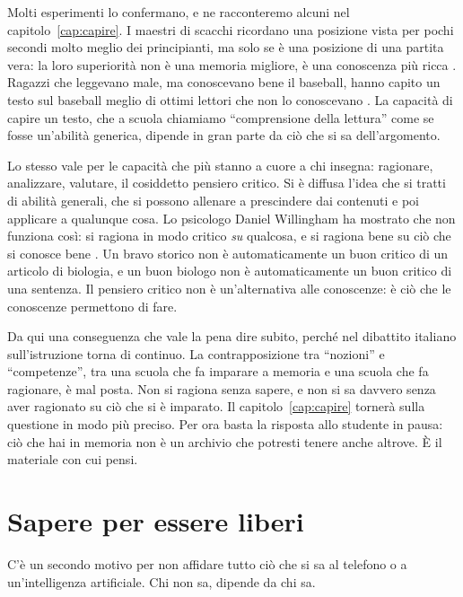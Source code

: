 Molti esperimenti lo confermano, e ne racconteremo alcuni nel
capitolo~\ref{cap:capire}. I maestri di scacchi ricordano una posizione
vista per pochi secondi molto meglio dei principianti, ma solo se è una
posizione di una partita vera: la loro superiorità non è una memoria
migliore, è una conoscenza più ricca \parencite{chase1973}. Ragazzi che
leggevano male, ma conoscevano bene il baseball, hanno capito un testo
sul baseball meglio di ottimi lettori che non lo conoscevano
\parencite{recht1988}. La capacità di capire un testo, che a scuola
chiamiamo \enquote{comprensione della lettura} come se fosse un'abilità
generica, dipende in gran parte da ciò che si sa dell'argomento.

Lo stesso vale per le capacità che più stanno a cuore a chi insegna:
ragionare, analizzare, valutare, il cosiddetto pensiero critico. Si è
diffusa l'idea che si tratti di abilità generali, che si possono
allenare a prescindere dai contenuti e poi applicare a qualunque cosa. Lo
psicologo Daniel Willingham ha mostrato che non funziona così: si
ragiona in modo critico \emph{su} qualcosa, e si ragiona bene su ciò che
si conosce bene \parencite{willingham2007}. Un bravo storico non è
automaticamente un buon critico di un articolo di biologia, e un buon
biologo non è automaticamente un buon critico di una sentenza. Il
pensiero critico non è un'alternativa alle conoscenze: è ciò che le
conoscenze permettono di fare.

Da qui una conseguenza che vale la pena dire subito, perché nel
dibattito italiano sull'istruzione torna di continuo. La contrapposizione
tra \enquote{nozioni} e \enquote{competenze}, tra una scuola che fa
imparare a memoria e una scuola che fa ragionare, è mal posta. Non si
ragiona senza sapere, e non si sa davvero senza aver ragionato su ciò
che si è imparato. Il capitolo~\ref{cap:capire} tornerà sulla questione
in modo più preciso. Per ora basta la risposta allo studente in pausa:
ciò che hai in memoria non è un archivio che potresti tenere anche
altrove. È il materiale con cui pensi.

\section{Sapere per essere liberi}

C'è un secondo motivo per non affidare tutto ciò che si sa al telefono o
a un'intelligenza artificiale. Chi non sa, dipende da chi sa.

